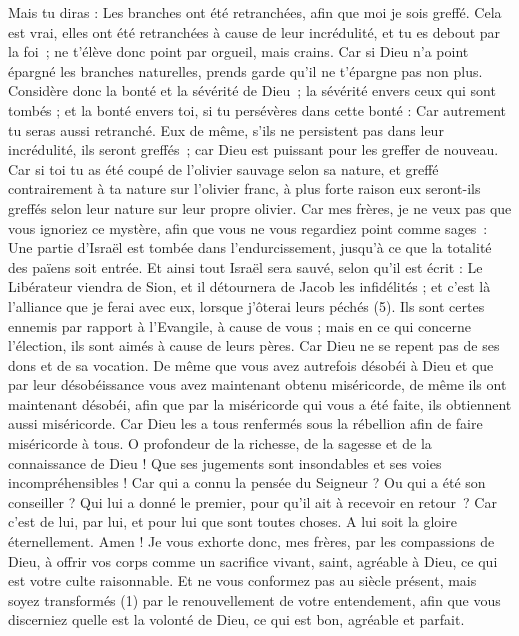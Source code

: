 \begin{multicols}{2}
Mais tu diras : Les branches ont été retranchées, afin que moi je sois greffé.
Cela est vrai, elles ont été retranchées à cause de leur incrédulité, et tu es debout par la foi ; ne t'élève donc point par orgueil, mais crains.
Car si Dieu n'a point épargné les branches naturelles, prends garde qu'il ne t'épargne pas non plus.
Considère donc la bonté et la sévérité de Dieu ; la sévérité envers ceux qui sont tombés ; et la bonté envers toi, si tu persévères dans cette bonté : Car autrement tu seras aussi retranché.
Eux de même, s'ils ne persistent pas dans leur incrédulité, ils seront greffés ; car Dieu est puissant pour les greffer de nouveau.
Car si toi tu as été coupé de l'olivier sauvage selon sa nature, et greffé contrairement à ta nature sur l'olivier franc, à plus forte raison eux seront-ils greffés selon leur nature sur leur propre olivier.
Car mes frères, je ne veux pas que vous ignoriez ce mystère, afin que vous ne vous regardiez point comme sages : Une partie d’Israël est tombée dans l’endurcissement, jusqu’à ce que la totalité des païens soit entrée.
Et ainsi tout Israël sera sauvé, selon qu’il est écrit : Le Libérateur viendra de Sion, et il détournera de Jacob les infidélités ;
et c'est là l'alliance que je ferai avec eux, lorsque j'ôterai leurs péchés (5).
Ils sont certes ennemis par rapport à l'Evangile, à cause de vous ; mais en ce qui concerne l’élection, ils sont aimés à cause de leurs pères.
Car Dieu ne se repent pas de ses dons et de sa vocation.
De même que vous avez autrefois désobéi à Dieu et que par leur désobéissance vous avez maintenant obtenu miséricorde,
de même ils ont maintenant désobéi, afin que par la miséricorde qui vous a été faite, ils obtiennent aussi miséricorde.
Car Dieu les a tous renfermés sous la rébellion afin de faire miséricorde à tous.
O profondeur de la richesse, de la sagesse et de la connaissance de Dieu ! Que ses jugements sont insondables et ses voies incompréhensibles !
Car qui a connu la pensée du Seigneur ? Ou qui a été son conseiller ?
Qui lui a donné le premier, pour qu’il ait à recevoir en retour ?
Car c’est de lui, par lui, et pour lui que sont toutes choses. A lui soit la gloire éternellement. Amen !
\VerseOne{}Je vous exhorte donc, mes frères, par les compassions de Dieu, à offrir vos corps comme un sacrifice vivant, saint, agréable à Dieu, ce qui est votre culte raisonnable.
Et ne vous conformez pas au siècle présent, mais soyez transformés (1) par le renouvellement de votre entendement, afin que vous discerniez quelle est la volonté de Dieu, ce qui est bon, agréable et parfait.

\end{multicols}
